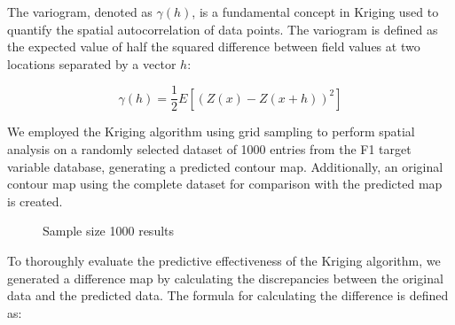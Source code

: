 \documentclass{swmcmthesis}
\begin{document}
The variogram, denoted as \(\gamma(h)\), is a fundamental concept in Kriging used to quantify the spatial autocorrelation of data points. The variogram is defined as the expected value of half the squared difference between field values at two locations separated by a vector \(h\):

\begin{equation}
\gamma(h) = \frac{1}{2} E\left[(Z(x) - Z(x + h))^2\right]
\end{equation}


We employed the Kriging algorithm using grid sampling to perform spatial analysis on a randomly selected dataset of 1000 entries from the F1 target variable database, generating a predicted contour map. Additionally, an original contour map using the complete dataset for comparison with the predicted map is created. 

\begin{figure}[h!t]
\centering
{}\hfill
{}
\caption{Sample size 1000 results}
\end{figure}

To thoroughly evaluate the predictive effectiveness of the Kriging algorithm, we generated a difference map by calculating the discrepancies between the original data and the predicted data. The formula for calculating the difference is defined as:
\end{document}
